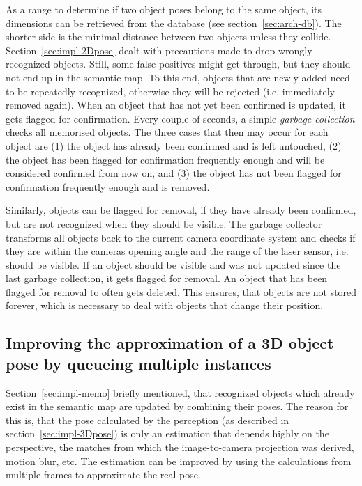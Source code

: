 As a range to determine if two object poses belong to the same object, its dimensions can be retrieved from the database (see section~\ref{sec:arch-db}). The shorter side is the minimal distance between two objects unless they collide. \\

Section~\ref{sec:impl-2Dpose} dealt with precautions made to drop wrongly recognized objects. Still, some false positives might get through, but they should not end up in the semantic map. To this end, objects that are newly added need to be repeatedly recognized, otherwise they will be rejected (i.e. immediately removed again). When an object that has not yet been confirmed is updated, it gets flagged for confirmation. Every couple of seconds, a simple \textit{garbage collection} checks all memorised objects. The three cases that then may occur for each object are (1) the object has already been confirmed and is left untouched, (2) the object has been flagged for confirmation frequently enough and will be considered confirmed from now on, and (3) the object has not been flagged for confirmation frequently enough and is removed.

Similarly, objects can be flagged for removal, if they have already been confirmed, but are not recognized when they should be visible. The garbage collector transforms all objects back to the current camera coordinate system and checks if they are within the cameras opening angle and the range of the laser sensor, i.e. should be visible. If an object should be visible and was not updated since the last garbage collection, it gets flagged for removal. An object that has been flagged for removal to often gets deleted. This ensures, that objects are not stored forever, which is necessary to deal with objects that change their position.

\subsection{Improving the approximation of a 3D object pose by queueing multiple instances}
\label{sec:impl-queue}
Section~\ref{sec:impl-memo} briefly mentioned, that recognized objects which already exist in the semantic map are updated by combining their poses. The reason for this is, that the pose calculated by the perception (as described in section~\ref{sec:impl-3Dpose}) is only an estimation that depends highly on the perspective, the matches from which the image-to-camera projection was derived, motion blur, etc. The estimation can be improved by using the calculations from multiple frames to approximate the real pose. \\

